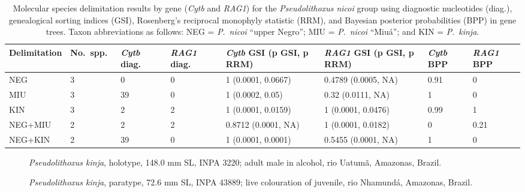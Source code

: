 \documentclass[12pt]{article}
\begin{document}
\newpage
\begin{table}[htbp]
\scriptsize
\caption{Molecular species delimitation results by gene (\emph{Cytb} and \emph{RAG1}) for the \emph{Pseudolithoxus nicoi} group using diagnostic nucleotides (diag.), genealogical sorting indices (GSI), Rosenberg's reciprocal monophyly statistic (RRM), and Bayesian posterior probabilities (BPP) in gene trees. %
Taxon abbreviations as follows: NEG = \emph{P}.\ \emph{nicoi} ``upper Negro''; MIU = \emph{P}.\ \emph{nicoi} ``Miuá''; and KIN = \emph{P}.\ \emph{kinja}.}
\begin{tabular}{llllllll}
\toprule
Delimitation & No.\ spp.\ & \emph{Cytb} diag.\ & \emph{RAG1} diag.\ & \emph{Cytb} GSI (p GSI, p RRM) & \emph{RAG1} GSI (p GSI, p RRM) & \emph{Cytb} BPP & \emph{RAG1} BPP\\
\midrule
NEG	 & 3 & 0 & 0 & 1 (0.0001, 0.0667) & 0.4789 (0.0005, NA) & 0.91 & 0\\
MIU & 3 & 39 & 0 & 1 (0.0002, 0.05) & 0.32 (0.0111, NA) & 1 & 0\\
KIN & 3 & 2 & 2 & 1 (0.0001, 0.0159) & 1 (0.0001, 0.0476) & 0.99 & 1\\
NEG+MIU & 2 & 2 & 2 & 0.8712 (0.0001, NA) & 1 (0.0001, 0.0182) & 0 & 0.21\\
NEG+KIN & 2 & 39 & 0 & 1 (0.0001, 0.0001) & 0.5455 (0.0001, NA) & 1 & 0\\
\bottomrule
\end{tabular}
\label{tab:metrics}
\end{table}


\newpage

\begin{figure}[!htbp]
\caption{\emph{Pseudolithoxus kinja}, holotype, 148.0 mm SL, INPA 3220; adult male in alcohol, rio Uatumã, Amazonas, Brazil.}
\begin{center}
\end{center}
\label{fig:holotype}
\end{figure}

\begin{figure}[!htbp]
\caption{\emph{Pseudolithoxus kinja}, paratype, 72.6 mm SL, INPA 43889; live colouration of juvenile, rio Nhamundá, Amazonas, Brazil.}
\begin{center}
\end{center}
\label{fig:paratype}
\end{figure}
\end{document}
